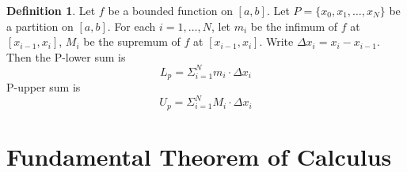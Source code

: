 \documentclass{article}
\theoremstyle{definition}
\newtheorem{definition}[theorem]{Definition}
\theoremstyle{remark}
\begin{document}
\begin{definition}
    Let $f$ be a bounded function on $[a,b]$.
    Let $P=\{x_0,x_1,\dots, x_N\}$ be a partition on $[a,b]$.
    For each $i=1,\dots ,N$, let $m_i$ be the infimum of $f$ at $[x_{i-1},x_i]$, $M_i$ be the supremum of $f$ at $[x_{i-1},x_i]$.
    Write $\Delta x_i=x_i-x_{i-1}$.
    Then the P-lower sum is \[
    L_p=\Sigma_{i=1}^N m_i\cdot\Delta x_i
    \]
    P-upper sum is \[
    U_p=\Sigma_{i=1}^N M_i\cdot\Delta x_i
    \]
\end{definition}

\section{Fundamental Theorem of Calculus}
\end{document}

